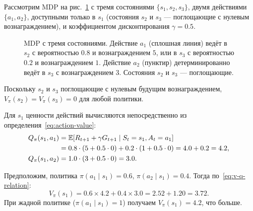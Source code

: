 \begin{example}
\label{ex:value-computation}
Рассмотрим MDP на рис.~\ref{fig:three-state-mdp} с тремя состояниями $\{s_1, s_2, s_3\}$, двумя действиями $\{a_1, a_2\}$, доступными только в $s_1$ (состояния $s_2$ и $s_3$ — поглощающие с нулевым вознаграждением), и коэффициентом дисконтирования $\gamma = 0.5$.

\begin{figure}[ht]
\centering
{}
\caption{MDP с тремя состояниями. Действие $a_1$ (сплошная линия) ведёт в $s_2$ с вероятностью $0.8$ и вознаграждением $5$, или в $s_3$ с вероятностью $0.2$ и вознаграждением $1$. Действие $a_2$ (пунктир) детерминированно ведёт в $s_3$ с вознаграждением $3$. Состояния $s_2$ и $s_3$ — поглощающие.}
\label{fig:three-state-mdp}
\end{figure}

Поскольку $s_2$ и $s_3$ поглощающие с нулевым будущим вознаграждением, $V_\pi(s_2) = V_\pi(s_3) = 0$ для любой политики.

Для $s_1$ ценности действий вычисляются непосредственно из определения~\eqref{eq:action-value}:
\begin{align*}
Q_\pi(s_1, a_1)
&= \operatorname{\mathbb{E}}[R_{t+1} + \gamma G_{t+1} \mid S_t = s_1, A_t = a_1] \\
&= 0.8 \cdot (5 + 0.5 \cdot 0) + 0.2 \cdot (1 + 0.5 \cdot 0)
 = 4.0 + 0.2 = 4.2, \\
Q_\pi(s_1, a_2)
&= 1.0 \cdot (3 + 0.5 \cdot 0) = 3.0.
\end{align*}

Предположим, политика $\pi(a_1 \mid s_1) = 0.6$, $\pi(a_2 \mid s_1) = 0.4$. Тогда по~\eqref{eq:v-q-relation}:
\[
V_\pi(s_1) = 0.6 \times 4.2 + 0.4 \times 3.0 = 2.52 + 1.20 = 3.72.
\]
При жадной политике ($\pi(a_1 \mid s_1) = 1$) получаем $V_\pi(s_1) = 4.2$, что больше.
\end{example}


